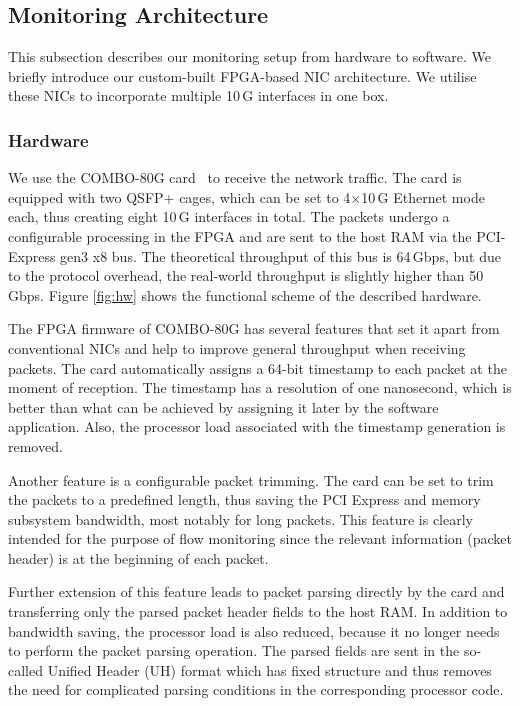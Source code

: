 \subsection{Monitoring Architecture} \label{subsec:high-density-monitoring-architecture}

This subsection describes our monitoring setup from hardware to software. We briefly introduce our custom-built FPGA-based NIC architecture. We utilise these NICs to incorporate multiple 10\,G interfaces in one box.

\subsubsection{Hardware}

We use the COMBO-80G card~\cite{Liberouter--COMBO} to receive the network traffic. The card is equipped with two QSFP+ cages, which can be set to 4$\times$10\,G Ethernet mode each, thus creating eight 10\,G interfaces in total. The packets undergo a configurable processing in the FPGA and are sent to the host RAM via the PCI-Express gen3 x8 bus. The theoretical throughput of this bus is 64\,Gbps, but due to the protocol overhead, the real-world throughput is slightly higher than 50\,Gbps. Figure \ref{fig:hw} shows the functional scheme of the described hardware.

The FPGA firmware of COMBO-80G has several features that set it apart from conventional NICs and help to improve general throughput when receiving packets. The card automatically assigns a 64-bit timestamp to each packet at the moment of reception. The timestamp has a resolution of one nanosecond, which is better than what can be achieved by assigning it later by the software application. Also, the processor load associated with the timestamp generation is removed.

Another feature is a configurable packet trimming. The card can be set to trim the packets to a predefined length, thus saving the PCI Express and memory subsystem bandwidth, most notably for long packets. This feature is clearly intended for the purpose of flow monitoring since the relevant information (packet header) is at the beginning of each packet.

Further extension of this feature leads to packet parsing directly by the card and transferring only the parsed packet header fields to the host RAM. In addition to bandwidth saving, the processor load is also reduced, because it no longer needs to perform the packet parsing operation. The parsed fields are sent in the so-called Unified Header (UH) format which has fixed structure and thus removes the need for complicated parsing conditions in the corresponding processor code.

